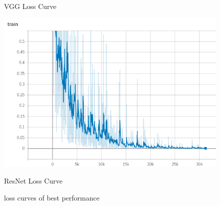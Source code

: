 \documentclass{article} %
\begin{document}
\begin{itemize}
\begin{figure}[htbp]
{\begin{minipage}[t]{0.45\linewidth}
\caption{VGG Loss Curve}
\end{minipage}
}
{
\begin{minipage}[t]{0.45\linewidth}
\centering
\includegraphics[scale=0.3]{2.png}
\caption{ResNet Loss Curve}
\end{minipage}
}
\centering
\caption{loss curves of best performance}
\end{figure}

\end{itemize}
\end{document}
